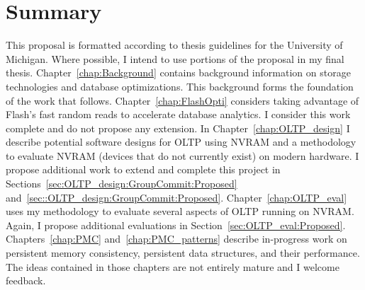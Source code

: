 \section{Summary}
\label{sec:Intro:Summary}
This proposal is formatted according to thesis guidelines for the University of Michigan.
Where possible, I intend to use portions of the proposal in my final thesis.
Chapter~\ref{chap:Background} contains background information on storage technologies and database optimizations.
This background forms the foundation of the work that follows.
Chapter~\ref{chap:FlashOpti} considers taking advantage of Flash's fast random reads to accelerate database analytics.
I consider this work complete and do not propose any extension.
In Chapter~\ref{chap:OLTP_design} I describe potential software designs for OLTP using NVRAM and a methodology to evaluate NVRAM (devices that do not currently exist) on modern hardware.
I propose additional work to extend and complete this project in Sections~\ref{sec:OLTP_design:GroupCommit:Proposed} and~\ref{sec::OLTP_design:GroupCommit:Proposed}.
Chapter~\ref{chap:OLTP_eval} uses my methodology to evaluate several aspects of OLTP running on NVRAM.
Again, I propose additional evaluations in Section~\ref{sec:OLTP_eval:Proposed}.
Chapters~\ref{chap:PMC} and~\ref{chap:PMC_patterns} describe in-progress work on persistent memory consistency, persistent data structures, and their performance.
The ideas contained in those chapters are not entirely mature and I welcome feedback.
